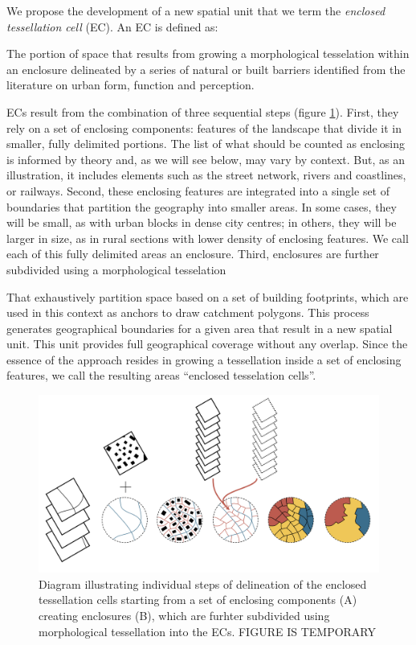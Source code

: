 We propose the development of a new spatial unit that we term the
\textit{enclosed tessellation cell} (EC).
An EC is defined as:
\begin{theorem}
        The portion of space that results from growing a morphological
tesselation within an enclosure delineated by a series of natural or built
barriers identified from the literature on urban form, function and perception.
\end{theorem}
ECs result from the combination of
three sequential steps (figure \ref{fig:tessellation}).
First, they rely on a set of enclosing components: features of the landscape
that divide it in smaller, fully delimited portions. The list of what should be
counted as enclosing is informed by theory and, as we will see below, may vary
by context. But, as an illustration, it includes elements such as the street
network, rivers and coastlines, or railways.
Second, these enclosing features are integrated into a single set of boundaries
that partition the geography into smaller areas. In some cases, they will be
small, as with urban blocks in dense city centres; in others, they will be
larger in size, as in rural sections with lower density of enclosing features.
We call each of this fully delimited areas an enclosure.
Third, enclosures are further subdivided using a morphological tesselation
\citep{fleischmann2020morphological}

That exhaustively partition space based on a set of building footprints,
which are used in this context as anchors to draw catchment polygons.
This process generates geographical boundaries for a given area that result in a
new spatial unit. This unit provides full geographical coverage without any
overlap.
%
Since the essence of the approach resides in growing a tessellation inside a set
of enclosing features, we call the resulting areas ``enclosed tesselation
cells''.

\begin{figure}
        \includegraphics[width=\linewidth]{figures/tessellation.png}
        \caption{Diagram illustrating individual steps of delineation of the enclosed
        tessellation cells starting from a set of enclosing components (A) creating
        enclosures (B), which are furhter subdivided using morphological tessellation
        into the ECs. FIGURE IS TEMPORARY}
        \label{fig:tessellation}
\end{figure}


